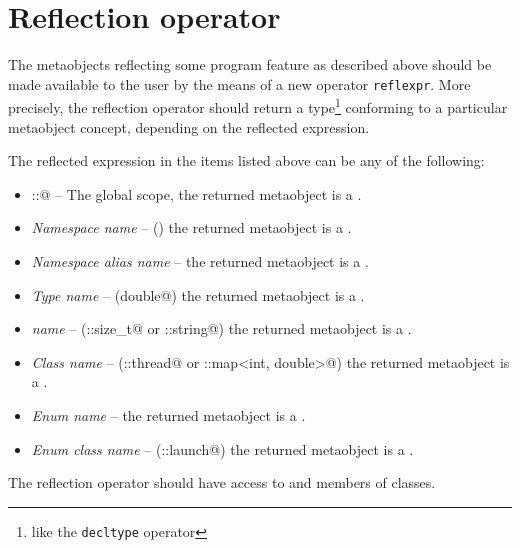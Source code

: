 \section{Reflection operator}
\label{section-reflection-operator}

The metaobjects reflecting some program feature \verb@X@ as
described above should be made available to the user by
the means of a new operator \texttt{reflexpr}.
More precisely, the reflection operator should return
a type\footnote{like the \texttt{decltype} operator} conforming to a particular
metaobject concept, depending on the reflected expression.

The reflected expression \verb@X@ in the items listed above can be any of the following:

\begin{itemize}
\item{\verb@::@} -- The global scope, the returned metaobject is a {}.
\item{{\em Namespace name}} -- (\verb@std@) the returned metaobject is a {}.
\item{{\em Namespace alias name}} -- the returned metaobject is a {}.
\item{{\em Type name}} -- (\verb@long double@) the returned metaobject is a {}.
\item{{\em \verb@typedef@ name}} -- (\verb@std::size_t@ or \verb@std::string@)
     the returned metaobject is a {}.
\item{{\em Class name}} -- (\verb@std::thread@ or \verb@std::map<int, double>@)
     the returned metaobject is a {}.
\item{{\em Enum name}} -- 
     the returned metaobject is a {}.
\item{{\em Enum class name}} -- (\verb@std::launch@)
     the returned metaobject is a {}.
\end{itemize}

The reflection operator should have access to \verb@private@ and
\verb@protected@ members of classes.

